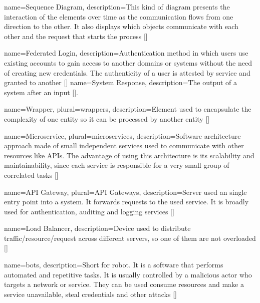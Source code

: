  {
    name={Sequence Diagram},
    description={This kind of diagram presents the interaction of the elements over time as the communication
    flows from one direction to the other. It also displays which objects communicate with each other and the 
    request that starts the process  [\cite{refmisc:sparxsD}]}
}




 {
    name={Federated Login},
    description={Authentication method in which users use existing accounts to gain access to another domains or systems
    without the need of creating new credentials. The authenticity of a user is attested by service and granted to another 
    [\cite{refonline:MRFL}]}
}
 {
    name={System Response},
    description={The output of a system after an input [\cite{refonline:HWHE}].}
}

 {
    name={Wrapper},
    plural={wrappers},
    description={Element used to encapsulate the complexity of one entity so it can be processed by another entity 
    [\cite{refonline:techwrap}]}
}

 {
    name={Microservice},
    plural={microservices},
    description={Software architecture approach made of small independent services used to communicate with other
    resources like APIs. The advantage of using this architecture is its scalability and maintainability, since 
    each service is responsible for a very small group of correlated tasks [\cite{refonline:awsmicro}]}
}

 {
    name={API Gateway},
    plural={API Gateways},
    description={Server used an single entry point into a system. It forwards requests to the used service. It is 
    broadly used for authentication, auditing and logging services [\cite{refonline:crpag}]}
}

 {
    name={Load Balancer},
    description={Device used to distribute traffic/resource/request across different servers, so one of them
    are not overloaded [\cite{refonline:nglb}]}
}

 {
    name={bots},
    description={Short for robot. It is a software that performs automated and repetitive tasks. It is usually
    controlled by a malicious actor who targets a network or service. They can be used consume resources
    and make a service unavailable, steal credentials and other attacks [\cite{refonline:kpbot}]}
}


